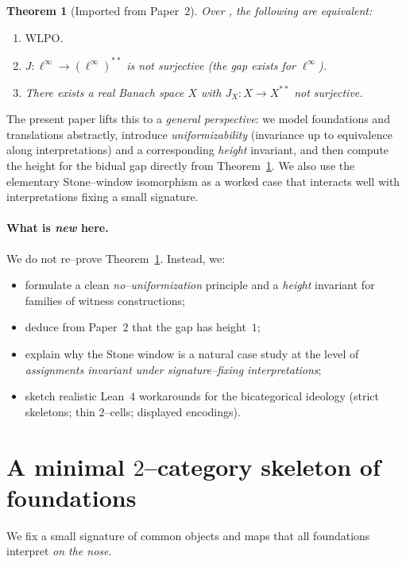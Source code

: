 \documentclass[11pt]{article}
\newtheorem{theorem}{Theorem}[section]
\theoremstyle{definition}
\theoremstyle{remark}
\newcommand{\linf}{\ell^\infty}
\newcommand{\WLPO}{\mathrm{WLPO}}
\newcommand{\BISH}{\mathrm{BISH}}
\begin{document}
\begin{theorem}[Imported from Paper~2]\label{thm:paper2}
Over \BISH, the following are equivalent:
\begin{enumerate}
\item $\WLPO$.
\item $J:\linf\to(\linf)^{**}$ is not surjective (the gap exists for $\linf$).
\item There exists a real Banach space $X$ with $J_X:X\to X^{**}$ not surjective.
\end{enumerate}
\end{theorem}

The present paper lifts this to a \emph{general perspective}: we model foundations and translations abstractly, introduce \emph{uniformizability} (invariance up to equivalence along interpretations) and a corresponding \emph{height} invariant, and then compute the height for the bidual gap directly from Theorem~\ref{thm:paper2}. We also use the elementary Stone--window isomorphism as a worked case that interacts well with interpretations fixing a small signature.

\paragraph{What is \emph{new} here.}
We do not re--prove Theorem~\ref{thm:paper2}. Instead, we:
\begin{itemize}
\item formulate a clean \emph{no--uniformization} principle and a \emph{height} invariant for families of witness constructions;
\item deduce from Paper~2 that the gap has height~$1$;
\item explain why the Stone window is a natural case study at the level of \emph{assignments invariant under signature--fixing interpretations};
\item sketch realistic Lean~4 workarounds for the bicategorical ideology (strict skeletons; thin $2$--cells; displayed encodings).
\end{itemize}

\section{A minimal $2$--category skeleton of foundations}\label{sec:found}

We fix a small signature of common objects and maps that all foundations interpret \emph{on the nose}.
\end{document}
